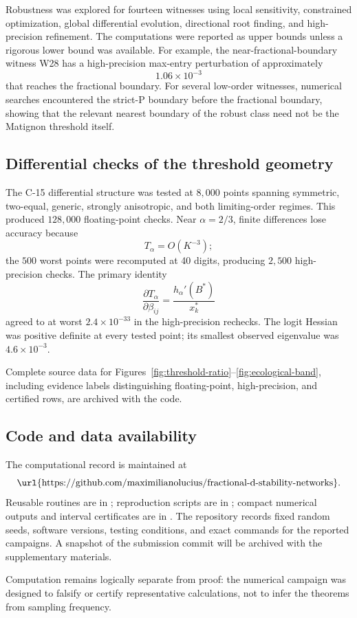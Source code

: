 Robustness was explored for fourteen witnesses using local sensitivity, constrained optimization, global differential evolution, directional root finding, and high-precision refinement. The computations were reported as upper bounds unless a rigorous lower bound was available. For example, the near-fractional-boundary witness W28 has a high-precision max-entry perturbation of approximately
\[
1.06\times10^{-3}
\]
that reaches the fractional boundary. For several low-order witnesses, numerical searches encountered the strict-P boundary before the fractional boundary, showing that the relevant nearest boundary of the robust class need not be the Matignon threshold itself.

\subsection{Differential checks of the threshold geometry}

The C-15 differential structure was tested at \(8{,}000\) points spanning symmetric, two-equal, generic, strongly anisotropic, and both limiting-order regimes. This produced \(128{,}000\) floating-point checks. Near \(\alpha=2/3\), finite differences lose accuracy because
\[
T_\alpha=O(K^{-3});
\]
the \(500\) worst points were recomputed at 40 digits, producing \(2{,}500\) high-precision checks. The primary identity
\[
\frac{\partial T_\alpha}{\partial\beta_{ij}}
=
\frac{h_\alpha'(B^*)}{x_k^*}
\]
agreed to at worst \(2.4\times10^{-33}\) in the high-precision rechecks. The logit Hessian was positive definite at every tested point; its smallest observed eigenvalue was \(4.6\times10^{-3}\).

Complete source data for Figures~\ref{fig:threshold-ratio}--\ref{fig:ecological-band}, including evidence labels distinguishing floating-point, high-precision, and certified rows, are archived with the code.

\subsection{Code and data availability}

The computational record is maintained at
\[
\text{\url{https://github.com/maximilianolucius/fractional-d-stability-networks}}.
\]
Reusable routines are in ; reproduction scripts are in ; compact numerical outputs and interval certificates are in . The repository records fixed random seeds, software versions, testing conditions, and exact commands for the reported campaigns. A snapshot of the submission commit will be archived with the supplementary materials.

Computation remains logically separate from proof: the numerical campaign was designed to falsify or certify representative calculations, not to infer the theorems from sampling frequency.
